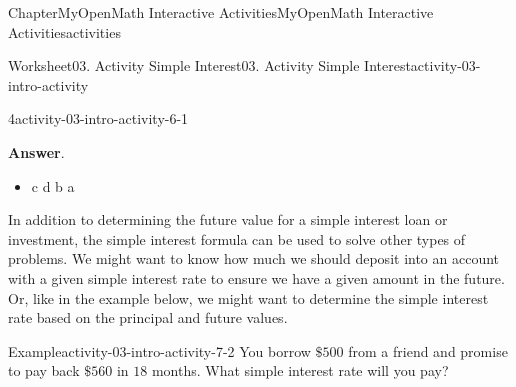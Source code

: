 \documentclass[oneside,10pt,]{book}
\newcommand{\blocktitlefont}{\relax}
\newcommand{\ptxlistdisc}{\raisebox{0.3ex}{\textbullet}}
\newlength{\fillinmaxwidth}
\newlength{\fillincontract}
\newlength{\charmaxwidth}\setlength{\charmaxwidth}{0.5em}
\newlength{\charminwidth}\setlength{\charminwidth}{0.1em}
\newlength{\fillinheight}
\newcommand{\fillintext}[1]{%
\setlength{\fillinmaxwidth}{#1\charmaxwidth}%
\setlength{\fillincontract}{#1\charminwidth}%
\setlength{\fillinheight}{\baselineskip}\addtolength{\fillinheight}{1.2pt}%
\strut\nobreak\leaders\vbox{\hrule width 0.3pt height 0.3pt \vskip -1.2pt}\hskip 1\fillinmaxwidth minus \fillincontract\nobreak\strut%
}
\begin{document}
\begin{chapterptx}{Chapter}{MyOpenMath Interactive Activities}{}{MyOpenMath Interactive Activities}{}{}{activities}
\begin{worksheet-section}{Worksheet}{03. Activity Simple Interest}{}{03. Activity Simple Interest}{}{}{activity-03-intro-activity}
\begin{divisionexercise}{4}{}{}{activity-03-intro-activity-6-1}
\begin{enumerate}[label={(\alph*)}]
\end{enumerate}
%
\par\smallskip%
\noindent\textbf{\blocktitlefont Answer}.\hypertarget{activity-03-intro-activity-6-1-2}{}\quad{}%
\begin{itemize}[label=\ptxlistdisc]
\item{}c d b a%
\end{itemize}
%
\end{divisionexercise}%
%
%
\clearpage
In addition to determining the future value for a simple interest loan or investment, the simple interest formula can be used to solve other types of problems. We might want to know how much we should deposit into an account with a given simple interest rate to ensure we have a given amount in the future. Or, like in the example below, we might want to determine the simple interest rate based on the principal and future values.%
\begin{example}{Example}{}{activity-03-intro-activity-7-2}%
You borrow \(\$500\) from a friend and promise to pay back \(\$560\) in \(18\) months. What simple interest rate will you pay?%

\end{example}
\end{worksheet-section}
\end{chapterptx}
\end{document}
